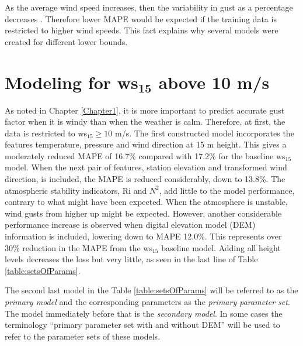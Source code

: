 As the average wind speed increases, then the variability in gust as a percentage decreases \cite{mean_gust_HA_HO}. Therefore lower MAPE would be expected if the training data is restricted to higher wind speeds. This fact explains why several models were created for different lower bounds.

\section{Modeling for ws$_{\textbf{15}}$ above 10 m/s}\label{sec:ws15_10}
As noted in Chapter \ref{Chapter1}, it is more important to predict accurate gust factor when it is windy than when the weather is calm. Therefore, at first, the data is restricted to ws$_{15} \geq 10$ m/s. The first constructed model incorporates the features temperature, pressure and wind direction at 15 m height. This gives a moderately reduced MAPE of 16.7\% compared with 17.2\% for the baseline ws$_{15}$ model. When the next pair of features, station elevation and transformed wind direction, is included, the MAPE is reduced considerably, down to 13.8\%. The atmospheric stability indicators, Ri and $N^2$, add little to the model performance, contrary to what might have been expected. When the atmosphere is unstable, wind gusts from higher up might be expected. However, another considerable performance increase is observed when digital elevation model (DEM) information is included, lowering down to MAPE 12.0\%. This represents over 30\% reduction in the MAPE from the ws$_{15}$ baseline model. Adding all height levels decreases the loss but very little, as seen in the last line of Table \ref{table:setsOfParams}.

The second last model in the Table \ref{table:setsOfParams} will be referred to as the \textit{primary model} and the corresponding parameters as the \textit{primary parameter set}. The model immediately before that is the \textit{secondary model}. In some cases the terminology ``primary parameter set with and without DEM'' will be used to refer to the parameter sets of these models.

